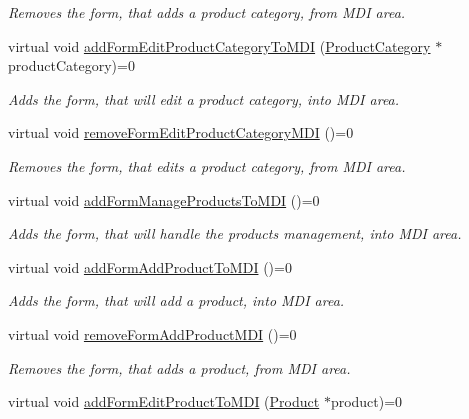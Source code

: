\begin{DoxyCompactItemize}
\begin{DoxyCompactList}\small\item\em \-Removes the form, that adds a product category, from \-M\-D\-I area. \end{DoxyCompactList}\item 
virtual void \hyperlink{class_i_main_window_a84c9ff9eed87ba986f0fa478f6507b6b}{add\-Form\-Edit\-Product\-Category\-To\-M\-D\-I} (\hyperlink{class_product_category}{\-Product\-Category} $\ast$product\-Category)=0
\begin{DoxyCompactList}\small\item\em \-Adds the form, that will edit a product category, into \-M\-D\-I area. \end{DoxyCompactList}\item 
virtual void \hyperlink{class_i_main_window_a1ecc8cf7cde5c24f8f1ac2285a3c68c8}{remove\-Form\-Edit\-Product\-Category\-M\-D\-I} ()=0
\begin{DoxyCompactList}\small\item\em \-Removes the form, that edits a product category, from \-M\-D\-I area. \end{DoxyCompactList}\item 
virtual void \hyperlink{class_i_main_window_a50de6a3fa5c6d3f6230ef68d76e4c945}{add\-Form\-Manage\-Products\-To\-M\-D\-I} ()=0
\begin{DoxyCompactList}\small\item\em \-Adds the form, that will handle the products management, into \-M\-D\-I area. \end{DoxyCompactList}\item 
virtual void \hyperlink{class_i_main_window_a4490ff442e06a49c883a292fc4843c65}{add\-Form\-Add\-Product\-To\-M\-D\-I} ()=0
\begin{DoxyCompactList}\small\item\em \-Adds the form, that will add a product, into \-M\-D\-I area. \end{DoxyCompactList}\item 
virtual void \hyperlink{class_i_main_window_aaa0da58ffa9b7dab11f1847bca566ef8}{remove\-Form\-Add\-Product\-M\-D\-I} ()=0
\begin{DoxyCompactList}\small\item\em \-Removes the form, that adds a product, from \-M\-D\-I area. \end{DoxyCompactList}\item 
virtual void \hyperlink{class_i_main_window_abddd3139cedb75c6537fcee72e238f86}{add\-Form\-Edit\-Product\-To\-M\-D\-I} (\hyperlink{class_product}{\-Product} $\ast$product)=0

\end{DoxyCompactItemize}
